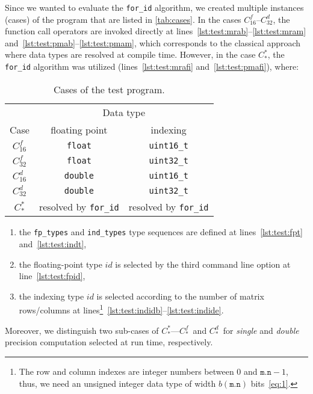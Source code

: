 \documentclass[10pt,a4paper]{article}
\theoremstyle{definition}\newtheorem{problem}{Problem}
\providecommand{\symidb}{\ensuremath{\mathit{id}}}
\providecommand{\symidbx}{\symidb\xspace}
\providecommand{\forid}{\texttt{for\_id}\xspace}
\providecommand{\casex}[1]{\ensuremath{#1}}
\providecommand{\caseA}{\casex{C_{16}^f}}
\providecommand{\caseB}{\casex{C_{32}^f}}
\providecommand{\caseC}{\casex{C_{16}^d}}
\providecommand{\caseD}{\casex{C_{32}^d}}
\providecommand{\caseE}{\casex{C_*^*}}
\providecommand{\caseEf}{\casex{C_*^f}}
\providecommand{\caseEd}{\casex{C_*^d}}
\begin{document}
Since we wanted to evaluate the \texttt{for\_id} algorithm, we created multiple instances (cases) of the program that are listed in \autoref{tab:cases}. In the cases \caseA--\caseD, the function call operators are invoked directly at lines~\ref{lst:test:mrab}--\ref{lst:test:mram} and~\ref{lst:test:pmab}--\ref{lst:test:pmam}, which corresponds to the classical approach where data types are resolved at compile time. However, in the case \caseE, the \forid algorithm was utilized (lines~\ref{lst:test:mrafi} and~\ref{lst:test:pmafi}), where:
\renewcommand{\arraystretch}{1.15}
\renewcommand{\tabcolsep}{2.6mm}
\begin{table}[t]
\caption{Cases of the test program.}
\begin{center}
\begin{tabular}{ccc}
\toprule
        & \multicolumn{2}{c}{Data type}          \\ \cmidrule(l){2-3}
Case    & floating point    & indexing           \\ \cmidrule(r){1-1} \cmidrule(l){2-3}
\caseA & \texttt{float}     & \texttt{uint16\_t} \\
\caseB & \texttt{float}     & \texttt{uint32\_t} \\
\caseC & \texttt{double}    & \texttt{uint16\_t} \\
\caseD & \texttt{double}    & \texttt{uint32\_t} \\
\caseE & resolved by \forid & resolved by \forid \\
\bottomrule
\end{tabular}
\end{center}
\label{tab:cases}
\end{table}
\begin{enumerate}

\item the \texttt{fp\_types} and \texttt{ind\_types} type sequences are defined at lines~\ref{lst:test:fpt} and~\ref{lst:test:indt},

\item the floating-point type \symidbx is selected by the third command line option at line~\ref{lst:test:fpid},

\item the indexing type \symidbx is selected according to the number of matrix rows/columns at lines\footnote{The row and column indexes are integer numbers between 0 and $\mathtt{m.n}-1$, thus, we need an unsigned integer data type of width $b(\texttt{m.n})$ bits~\eqref{eq:1}.}~\ref{lst:test:indidb}--\ref{lst:test:indide}.

\end{enumerate}
\noindent
Moreover, we distinguish two sub-cases of \caseE---\caseEf\ and \caseEd\ for  \emph{single} and \emph{double} precision computation selected at run time, respectively.
\end{document}
